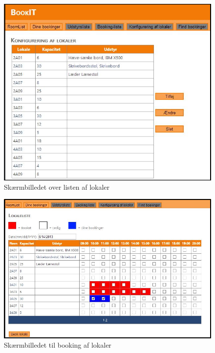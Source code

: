 \begin{figure}[h!]
  \centering
    \includegraphics[width=\textwidth]{Appendix/GUI-Prototype/DigitalMockup/LokaleListe}
  \caption{Skærmbilledet over listen af lokaler}
\label{App_GUI_final_LokaleListe}
\end{figure}

\begin{figure}[h!]
  \centering
    \includegraphics[width=\textwidth]{Appendix/GUI-Prototype/DigitalMockup/GridEksempel}
  \caption{Skærmbilledet til booking af lokaler}
\label{App_GUI_final_GridEksempel}
\end{figure}

